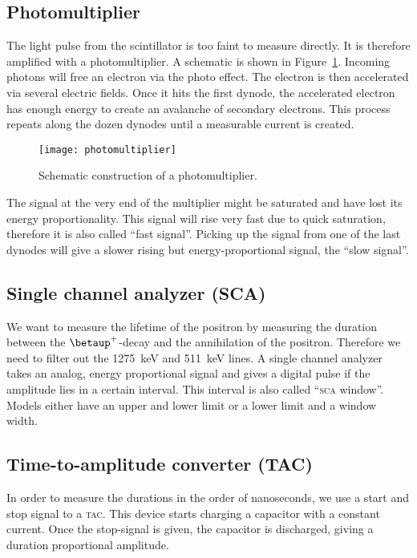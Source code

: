 \documentclass[11pt, english, fleqn, DIV=15, headinclude, BCOR=2cm]{scrreprt}
\begin{document}
\subsection{Photomultiplier}

The light pulse from the scintillator is too faint to measure directly. It is
therefore amplified with a photomultiplier. A schematic is shown in
Figure~\ref{fig:photomultiplier}. Incoming photons will free an electron via
the photo effect. The electron is then accelerated via several electric fields.
Once it hits the first dynode, the accelerated electron has enough energy to
create an avalanche of secondary electrons. This process repeats along the
dozen dynodes until a measurable current is created.

\begin{figure}
    \centering
    \texttt{[image: photomultiplier]}
    \caption{%
        Schematic construction of a photomultiplier.
    }
    \label{fig:photomultiplier}
\end{figure}

The signal at the very end of the multiplier might be saturated and have lost
its energy proportionality. This signal will rise very fast due to quick
saturation, therefore it is also called \enquote{fast signal}. Picking up the
signal from one of the last dynodes will give a slower rising but
energy-proportional signal, the \enquote{slow signal}.

\subsection{Single channel analyzer (SCA)}

We want to measure the lifetime of the positron by measuring the duration
between the $\betaup^+$-decay and the annihilation of the positron. Therefore we
need to filter out the \SI{1275}{\kilo\electronvolt} and
\SI{511}{\kilo\electronvolt} lines. A single channel analyzer takes an analog,
energy proportional signal and gives a digital pulse if the amplitude lies in a
certain interval. This interval is also called \enquote{\textsc{sca} window}. Models
either have an upper and lower limit or a lower limit and a window width.

\subsection{Time-to-amplitude converter (TAC)}

In order to measure the durations in the order of nanoseconds, we use a start
and stop signal to a \textsc{tac}\@. This device starts charging a capacitor with a
constant current. Once the stop-signal is given, the capacitor is discharged,
giving a duration proportional amplitude.
\end{document}
